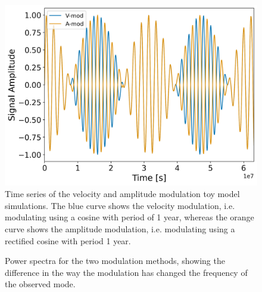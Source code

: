 \begin{figure}[!ht]
	\centering
	\includegraphics[width=0.65\columnwidth]{modulation_plot.png}
	\caption{Time series of the velocity and amplitude modulation toy model simulations. The blue curve shows the velocity modulation, i.e. modulating using a cosine with period of 1 year, whereas the orange curve shows the amplitude modulation, i.e. modulating using a rectified cosine with period 1 year.}  \label{fig:modulation}
\end{figure}

\begin{figure}[!ht]
	\centering
	\qquad
	\caption{Power spectra for the two modulation methods, showing the difference in the way the modulation has changed the frequency of the observed mode.}  \label{fig:modulation_PSDs}
\end{figure}

